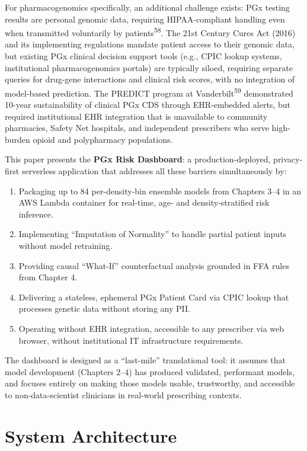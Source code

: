 \documentclass[
  12pt,
]{book}
\providecommand{\tightlist}{%
  \setlength{\itemsep}{0pt}\setlength{\parskip}{0pt}}
\begin{document}
For pharmacogenomics specifically, an additional challenge exists: PGx
testing results are personal genomic data, requiring HIPAA-compliant
handling even when transmitted voluntarily by
patients\textsuperscript{58}. The 21st Century Cures Act (2016) and its
implementing regulations mandate patient access to their genomic data,
but existing PGx clinical decision support tools (e.g., CPIC lookup
systems, institutional pharmacogenomics portals) are typically siloed,
requiring separate queries for drug-gene interactions and clinical risk
scores, with no integration of model-based prediction. The PREDICT
program at Vanderbilt\textsuperscript{59} demonstrated 10-year
sustainability of clinical PGx CDS through EHR-embedded alerts, but
required institutional EHR integration that is unavailable to community
pharmacies, Safety Net hospitals, and independent prescribers who serve
high-burden opioid and polypharmacy populations.

This paper presents the \textbf{PGx Risk Dashboard}: a
production-deployed, privacy-first serverless application that addresses
all these barriers simultaneously by:

\begin{enumerate}
\def\labelenumi{\arabic{enumi}.}
\tightlist
\item
  Packaging up to 84 per-density-bin ensemble models from Chapters 3--4
  in an AWS Lambda container for real-time, age- and density-stratified
  risk inference.
\item
  Implementing ``Imputation of Normality'' to handle partial patient
  inputs without model retraining.
\item
  Providing causal ``What-If'' counterfactual analysis grounded in FFA
  rules from Chapter 4.
\item
  Delivering a stateless, ephemeral PGx Patient Card via CPIC lookup
  that processes genetic data without storing any PII.
\item
  Operating without EHR integration, accessible to any prescriber via
  web browser, without institutional IT infrastructure requirements.
\end{enumerate}

The dashboard is designed as a ``last-mile'' translational tool: it
assumes that model development (Chapters 2--4) has produced validated,
performant models, and focuses entirely on making those models usable,
trustworthy, and accessible to non-data-scientist clinicians in
real-world prescribing contexts.

\chapter{System Architecture}\label{sec-architecture}
\end{document}
